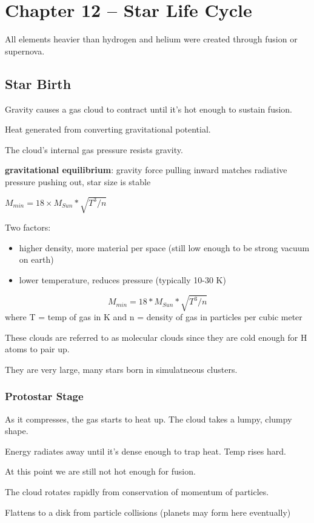 \section{Chapter 12 -- Star Life Cycle}
All elements heavier than hydrogen and helium were created through fusion or supernova.

\subsection{Star Birth}
Gravity causes a gas cloud to contract until it's hot enough to sustain fusion.

Heat generated from converting gravitational potential.

The cloud's internal gas pressure resists gravity.

{\bf gravitational equilibrium}: gravity force pulling inward matches radiative pressure pushing out, star size is stable

$M_{min} = 18 \times M_{Sun} * \sqrt{T^3 / n}$

Two factors:
\begin{itemize}
\item higher density, more material per space (still low enough to be strong vacuum on earth)
\item lower temperature, reduces pressure (typically 10-30 K)
\end{itemize}

\[ M_{min} = 18 * M_{Sun} * \sqrt{T^3 / n} \] where T = temp of gas in K and n = density of gas in particles per cubic meter

These clouds are referred to as molecular clouds since they are cold enough for H atoms to pair up.

They are very large, many stars born in simulatneous clusters.

\subsubsection{Protostar Stage}
As it compresses, the gas starts to heat up. The cloud takes a lumpy, clumpy shape.

Energy radiates away until it's dense enough to trap heat. Temp rises hard.

At this point we are still not hot enough for fusion.

The cloud rotates rapidly from conservation of momentum of particles.

Flattens to a disk from particle collisions (planets may form here eventually)

